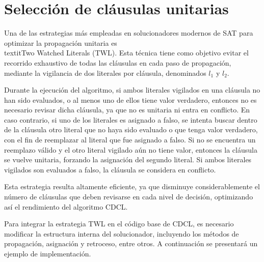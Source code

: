 \section{Selecci\'on de cl\'ausulas unitarias}

Una de las estrategias m\'as empleadas en solucionadores modernos de SAT para optimizar la propagaci\'on unitaria es \\textit{Two Watched Literals (TWL)}. Esta t\'ecnica tiene como objetivo evitar el recorrido exhaustivo de todas las cl\'ausulas en cada paso de propagaci\'on, mediante la vigilancia de dos literales por cl\'ausula, denominados $l_1$ y $l_2$.

Durante la ejecuci\'on del algoritmo, si ambos literales vigilados en una cl\'ausula no han sido evaluados, o al menos uno de ellos tiene valor verdadero, entonces no es necesario revisar dicha cl\'ausula, ya que no es unitaria ni entra en conflicto. En caso contrario, si uno de los literales es asignado a falso, se intenta buscar dentro de la cl\'ausula otro literal que no haya sido evaluado o que tenga valor verdadero, con el fin de reemplazar al literal que fue asignado a falso. Si no se encuentra un reemplazo v\'alido y el otro literal vigilado a\'un no tiene valor, entonces la cl\'ausula se vuelve unitaria, forzando la asignaci\'on del segundo literal. Si ambos literales vigilados son evaluados a falso, la cl\'ausula se considera en conflicto.

Esta estrategia resulta altamente eficiente, ya que disminuye considerablemente el n\'umero de cl\'ausulas que deben revisarse en cada nivel de decisi\'on, optimizando as\'i el rendimiento del algoritmo CDCL.

Para integrar la estrategia TWL en el c\'odigo base de CDCL, es necesario modificar la estructura interna del solucionador, incluyendo los m\'etodos de propagaci\'on, asignaci\'on y retroceso, entre otros. A continuaci\'on se presentar\'a un ejemplo de implementaci\'on.


